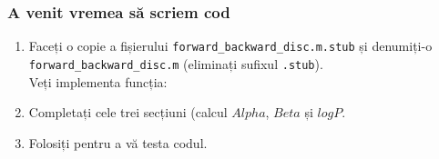 \begin{frame}
  \frametitle{A venit vremea să scriem cod}
  \begin{enumerate}
  \item Faceți o copie a fișierului \texttt{forward\_backward\_disc.m.stub} 
    și denumiți-o \texttt{forward\_backward\_disc.m} (eliminați sufixul \texttt{.stub}).
    \\Veți implementa funcția:\\
    \pause
  \item Completați cele trei secțiuni (calcul $Alpha$, $Beta$ și $logP$.%
    \vspace*{-.5em}
    
\item Folosiți  pentru a vă testa codul.
\end{enumerate}
\end{frame}
